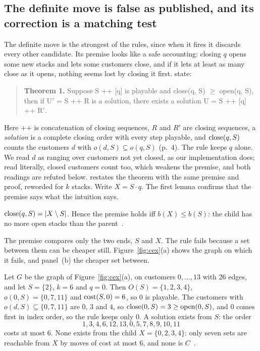\subsection{The definite move is false as published, and its correction is a matching test}
\label{sec:definite}

The definite move is the strongest of the rules, since when it fires it
discards every other candidate. Its premise looks like a safe accounting:
closing $q$ opens some new stacks and lets some customers close, and if it
lets at least as many close as it opens, nothing seems lost by closing it
first. \citet[\S3.1, p.~6]{ChuStuckey2009} state:
\begin{quote}
\textbf{Theorem 1.} Suppose S ++ [q] is playable and close(q, S) $\ge$
open(q, S), then if U$'$ = S ++ R is a solution, there exists a solution
U = S ++ [q] ++ R$'$.
\end{quote}
Here ++ is concatenation of closing sequences, $R$ and $R'$ are closing
sequences, a \emph{solution} is a complete closing order with every step
playable, and $\mathrm{close}(q,S)$ counts the customers
$d$ with $o(d,S)\subseteq o(q,S)$ (p.~4). The rule keeps $q$ alone. We read $d$
as ranging over customers not yet closed, as our implementation does; read
literally, closed customers count too, which weakens the premise, and both
readings are refuted below. \citet[Thm~6.3.6, p.~142]{Chu2011} restates the
theorem with the same premise and proof, reworded for $k$ stacks. Write
$X=S\cdot q$. The first lemma confirms that the premise says what the
intuition says.

\begin{lemma}\label{lem:premise}
$\mathrm{close}(q,S)=|X\setminus S|$. Hence the premise holds iff $b(X)\le b(S)$: the
child has no more open stacks than the parent~.
\end{lemma}

The premise compares only the two ends, $S$ and $X$. The rule fails because a
set between them can be cheaper still. Figure~\ref{fig:cex}(a) shows the graph on
which it fails, and panel~(b) the cheaper set between.

\begin{counterexample}\label{cex:definite}
Let $G$ be the graph of Figure~\ref{fig:cex}(a), on customers $0,\dots,13$
with 26 edges, and let $S=\{2\}$, $k=6$ and $q=0$. Then $O(S)=\{1,2,3,4\}$,
$o(0,S)=\{0,7,11\}$ and $\mathrm{cost}(S,0)=6$, so $0$ is playable. The customers with
$o(d,S)\subseteq\{0,7,11\}$ are $0$, $3$ and $4$, so $\mathrm{close}(0,S)=3\ge\mathrm{open}(0,S)$,
and $0$ comes first in index order, so the rule keeps only $0$. A solution
exists from $S$: the order
\[1,3,4,6,12,13,0,5,7,8,9,10,11\]
costs at most 6. None exists from the child $X=\{0,2,3,4\}$: only seven sets
are reachable from $X$ by moves of cost at most 6, and none is $C$~.
\end{counterexample}


